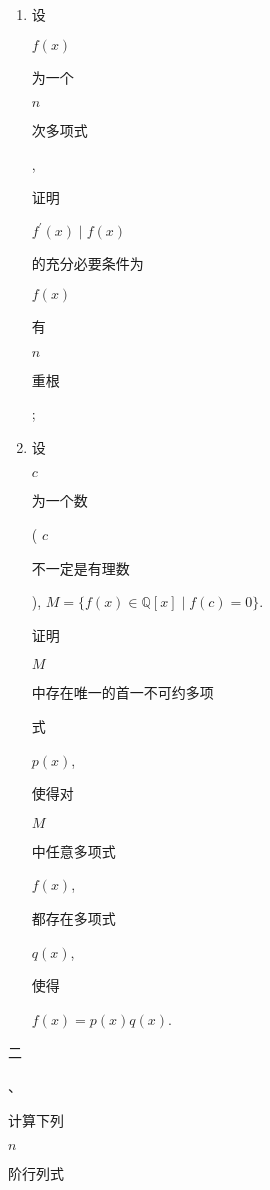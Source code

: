 \documentclass[10pt]{article}
\begin{document}
\begin{enumerate}
  \item \begin{CJK}{UTF8}{mj}设\end{CJK} $f(x)$ \begin{CJK}{UTF8}{mj}为一个\end{CJK} $n$ \begin{CJK}{UTF8}{mj}次多项式\end{CJK}, \begin{CJK}{UTF8}{mj}证明\end{CJK} $f^{\prime}(x) \mid f(x)$ \begin{CJK}{UTF8}{mj}的充分必要条件为\end{CJK} $f(x)$ \begin{CJK}{UTF8}{mj}有\end{CJK} $n$ \begin{CJK}{UTF8}{mj}重根\end{CJK};

  \item \begin{CJK}{UTF8}{mj}设\end{CJK} $c$ \begin{CJK}{UTF8}{mj}为一个数\end{CJK} ( $c$ \begin{CJK}{UTF8}{mj}不一定是有理数\end{CJK}), $M=\{f(x) \in \mathbb{Q}[x] \mid f(c)=0\}$. \begin{CJK}{UTF8}{mj}证明\end{CJK} $M$ \begin{CJK}{UTF8}{mj}中存在唯一的首一不可约多项\end{CJK} \begin{CJK}{UTF8}{mj}式\end{CJK} $p(x)$, \begin{CJK}{UTF8}{mj}使得对\end{CJK} $M$ \begin{CJK}{UTF8}{mj}中任意多项式\end{CJK} $f(x)$, \begin{CJK}{UTF8}{mj}都存在多项式\end{CJK} $q(x)$, \begin{CJK}{UTF8}{mj}使得\end{CJK} $f(x)=p(x) q(x)$.

\end{enumerate}
\begin{CJK}{UTF8}{mj}二\end{CJK}、\begin{CJK}{UTF8}{mj}计算下列\end{CJK} $n$ \begin{CJK}{UTF8}{mj}阶行列式\end{CJK}
\end{document}
